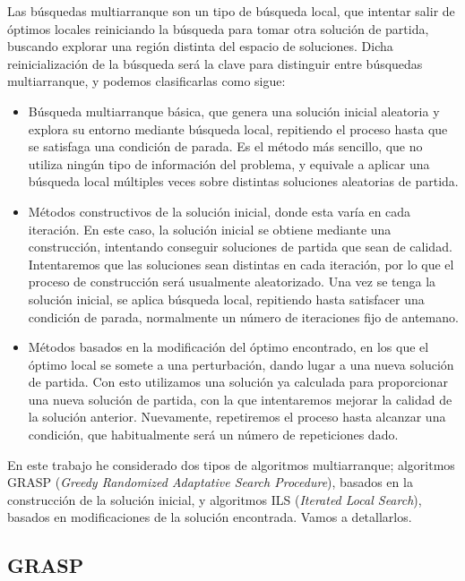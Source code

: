 Las búsquedas multiarranque son un tipo de búsqueda local, que intentar salir de óptimos
locales reiniciando la búsqueda para tomar otra solución de partida, buscando explorar
una región distinta del espacio de soluciones. Dicha reinicialización de la búsqueda será
la clave para distinguir entre búsquedas multiarranque, y podemos clasificarlas como sigue:

\begin{itemize}
  \item Búsqueda multiarranque básica, que genera una solución inicial aleatoria y explora su entorno
        mediante búsqueda local, repitiendo el proceso hasta que se satisfaga una condición de parada.
        Es el método más sencillo, que no utiliza ningún tipo de información del problema, y equivale
        a aplicar una búsqueda local múltiples veces sobre distintas soluciones aleatorias de partida.

  \item Métodos constructivos de la solución inicial, donde esta varía en cada iteración. En este caso,
        la solución inicial se obtiene mediante una construcción, intentando conseguir soluciones de
        partida que sean de calidad. Intentaremos que las soluciones sean distintas en cada iteración,
        por lo que el proceso de construcción será usualmente aleatorizado. Una vez se tenga la solución
        inicial, se aplica búsqueda local, repitiendo hasta satisfacer una condición de parada,
        normalmente un número de iteraciones fijo de antemano.

  \item Métodos basados en la modificación del óptimo encontrado, en los que el óptimo local se somete
        a una perturbación, dando lugar a una nueva solución de partida. Con esto utilizamos una
        solución ya calculada para proporcionar una nueva solución de partida, con la que intentaremos
        mejorar la calidad de la solución anterior. Nuevamente, repetiremos el proceso hasta alcanzar
        una condición, que habitualmente será un número de repeticiones dado.
\end{itemize}

En este trabajo he considerado dos tipos de algoritmos multiarranque; algoritmos GRASP
(\textit{Greedy Randomized Adaptative Search Procedure}), basados en la construcción
de la solución inicial, y algoritmos ILS (\textit{Iterated Local Search}), basados
en modificaciones de la solución encontrada. Vamos a detallarlos.

\subsection{GRASP}\label{grasp}

